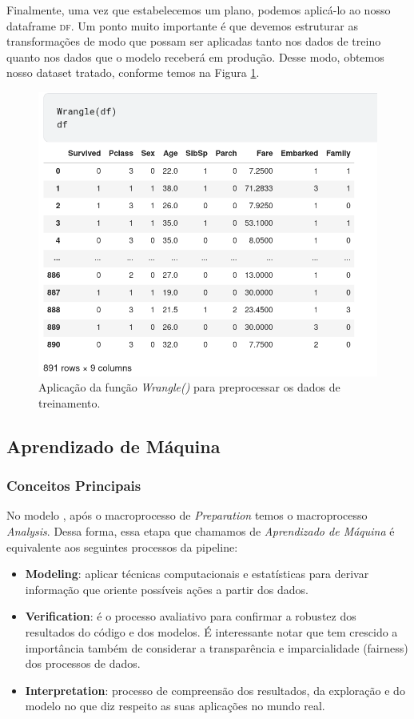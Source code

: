 \documentclass{article}
\begin{document}
Finalmente, uma vez que estabelecemos um plano, podemos aplicá-lo ao nosso dataframe \textsc{df}. Um ponto muito importante é que devemos estruturar as transformações de modo que possam ser aplicadas tanto nos dados de treino quanto nos dados que o modelo receberá em produção. Desse modo, obtemos nosso dataset tratado, conforme temos na Figura \ref{wranglin.results}.

\begin{figure}[H]
\centering
\includegraphics[width=\textwidth]{Figures/wrangle_results.png}
\caption{\label{wranglin.results}Aplicação da função \emph{Wrangle()} para preprocessar os dados de treinamento.}
\end{figure}

\subsection{Aprendizado de Máquina}
\subsubsection{Conceitos Principais}
No modelo \cite{BATON}, após o macroprocesso de \textit{Preparation} temos o macroprocesso \textit{Analysis}. Dessa forma, essa etapa que chamamos de \textit{Aprendizado de Máquina} é equivalente aos seguintes processos da pipeline:
\begin{itemize}
\item \textbf{Modeling}: aplicar técnicas computacionais e estatísticas para derivar informação que oriente possíveis ações a partir dos dados. 
\item \textbf{Verification}: é o processo avaliativo para confirmar a robustez dos resultados do código e dos modelos. É interessante notar que tem crescido a importância também de considerar a transparência e imparcialidade (fairness) dos processos de dados. 
\item \textbf{Interpretation}: processo de compreensão dos resultados, da exploração e do modelo no que diz respeito as suas aplicações no mundo real.
\end{itemize}
\end{document}
